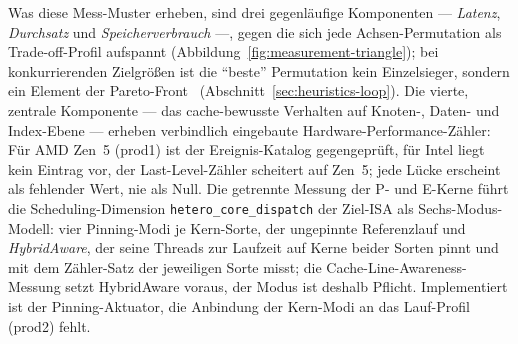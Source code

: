 \begin{nurkurz}
Was diese Mess-Muster erheben, sind drei gegenläufige Komponenten --- \emph{Latenz}, \emph{Durchsatz} und
\emph{Speicherverbrauch} ---, gegen die sich jede Achsen-Permutation als Trade-off-Profil aufspannt
(Abbildung~\ref{fig:measurement-triangle}); bei konkurrierenden Zielgrößen ist die \enquote{beste} Permutation
kein Einzelsieger, sondern ein Element der Pareto-Front~\cite{ehrgott2005multicriteria}
(Abschnitt~\ref{sec:heuristics-loop}). Die vierte, zentrale Komponente --- das cache-bewusste Verhalten auf
Knoten-, Daten- und Index-Ebene --- erheben verbindlich eingebaute Hardware-Performance-Zähler: Für AMD Zen~5
(prod1) ist der Ereignis-Katalog gegengeprüft, für Intel liegt kein Eintrag vor, der Last-Level-Zähler
scheitert auf Zen~5; jede Lücke erscheint als fehlender Wert, nie als Null. Die getrennte Messung der P- und
E-Kerne führt die Scheduling-Dimension \texttt{hetero\_core\_dispatch} der Ziel-ISA als Sechs-Modus-Modell:
vier Pinning-Modi je Kern-Sorte, der ungepinnte Referenzlauf und \emph{HybridAware}, der seine Threads zur
Laufzeit auf Kerne beider Sorten pinnt und mit dem Zähler-Satz der jeweiligen Sorte misst; die
Cache-Line-Awareness-Messung setzt HybridAware voraus, der Modus ist deshalb Pflicht. Implementiert ist der
Pinning-Aktuator, die Anbindung der Kern-Modi an das Lauf-Profil (prod2) fehlt.
\begin{figure}[htbp]\centering
{}
\end{figure}
\end{nurkurz}
